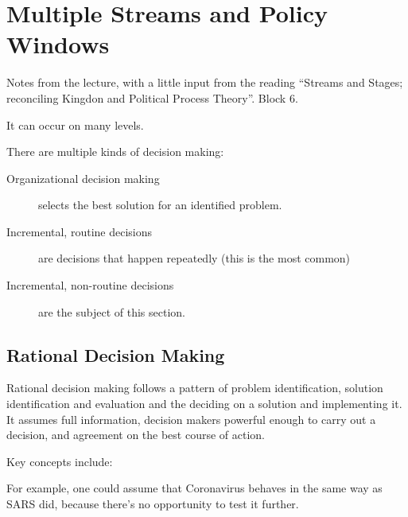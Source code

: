\section{Multiple Streams and Policy Windows}
\begin{flushright}
  \scriptsize Notes from the lecture, with a little input from the
  reading ``Streams and Stages; reconciling Kingdon and Political
  Process Theory''. Block 6.
\end{flushright}


 It
can occur on many levels.

There are multiple kinds of decision making:
\begin{description}
  \item[Organizational decision making] selects the best solution for an
    identified problem.
  \item[Incremental, routine decisions] are decisions that happen
    repeatedly (this is the most common)
  \item[Incremental, non-routine decisions] are the subject of this
    section.
\end{description}

\subsection{Rational Decision Making}


Rational decision making follows a pattern of problem identification,
solution identification and evaluation and the deciding on a solution
and implementing it. It assumes full information, decision makers
powerful enough to carry out a decision, and agreement on the best
course of action.

Key concepts include:

 For example, one could assume that Coronavirus behaves
in the same way as SARS did, because there's no opportunity to test it
further.

